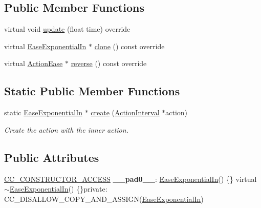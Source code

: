 \subsection*{Public Member Functions}
\begin{DoxyCompactItemize}
\item 
virtual void \hyperlink{classEaseExponentialIn_abc674dd0975bb25dd079583546516602}{update} (float time) override
\item 
virtual \hyperlink{classEaseExponentialIn}{Ease\+Exponential\+In} $\ast$ \hyperlink{classEaseExponentialIn_a028a3801fc36418cf59018c457b8a102}{clone} () const override
\item 
virtual \hyperlink{classActionEase}{Action\+Ease} $\ast$ \hyperlink{classEaseExponentialIn_aed789ba9f06994ce25edbba5d6de5178}{reverse} () const override
\end{DoxyCompactItemize}
\subsection*{Static Public Member Functions}
\begin{DoxyCompactItemize}
\item 
static \hyperlink{classEaseExponentialIn}{Ease\+Exponential\+In} $\ast$ \hyperlink{classEaseExponentialIn_add0f518c7b323078d69de4433106294c}{create} (\hyperlink{classActionInterval}{Action\+Interval} $\ast$action)
\begin{DoxyCompactList}\small\item\em Create the action with the inner action. \end{DoxyCompactList}\end{DoxyCompactItemize}
\subsection*{Public Attributes}
\begin{DoxyCompactItemize}
\item 
\mbox{\label{classEaseExponentialIn_ade31fb60bfc32860cfc20a7a5f0bdf6e}} 
\hyperlink{_2cocos2d_2cocos_2base_2ccConfig_8h_a25ef1314f97c35a2ed3d029b0ead6da0}{C\+C\+\_\+\+C\+O\+N\+S\+T\+R\+U\+C\+T\+O\+R\+\_\+\+A\+C\+C\+E\+SS} {\bfseries \+\_\+\+\_\+pad0\+\_\+\+\_\+}\+: \hyperlink{classEaseExponentialIn}{Ease\+Exponential\+In}() \{\} virtual $\sim$\hyperlink{classEaseExponentialIn}{Ease\+Exponential\+In}() \{\}private\+: C\+C\+\_\+\+D\+I\+S\+A\+L\+L\+O\+W\+\_\+\+C\+O\+P\+Y\+\_\+\+A\+N\+D\+\_\+\+A\+S\+S\+I\+GN(\hyperlink{classEaseExponentialIn}{Ease\+Exponential\+In})
\end{DoxyCompactItemize}
